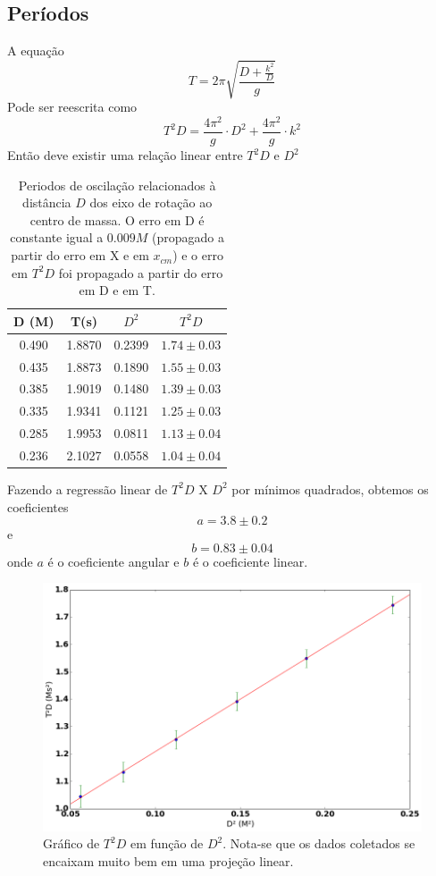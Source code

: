 \documentclass[12pt,a4paper]{article}
\begin{document}
\subsection{Períodos}
A equação $$ T = 2\pi\sqrt{\frac{D + \frac{k^2}{D}}{g}} $$ 
Pode ser reescrita como 
$$ T^2D = \frac{4\pi^2}{g} \cdot D^2 + \frac{4\pi^2}{g} \cdot k^2 $$ 
Então deve existir uma relação linear entre $T^2D$ e $D^2$


  
\begin{table}[!htbp]
\def\arraystretch{1.5}
\begin{tabular}{|c|c|c|c|}
\hline
D (M)& T(s) & $D^2$ & $T^2D$ \\
\hline
0.490 & 1.8870 & 0.2399 & $1.74 \pm 0.03$\\
\hline
0.435 & 1.8873 & 0.1890 & $1.55 \pm 0.03$\\
\hline
0.385 & 1.9019 & 0.1480 & $1.39 \pm 0.03$\\
\hline
0.335 & 1.9341 & 0.1121 & $1.25 \pm 0.03$\\
\hline
0.285 & 1.9953 & 0.0811 & $1.13 \pm 0.04$\\
\hline
0.236 & 2.1027 & 0.0558 & $1.04 \pm 0.04$\\
\hline
\end{tabular} 


\caption{Periodos de oscilação relacionados à distância $D$ dos eixo de rotação ao centro de massa. O erro em D é constante igual a $0.009 M$ (propagado a partir do erro em X e em $x_{cm}$) e o erro em $T^2D$ foi propagado a partir do erro em D e em T.}
\end{table}

Fazendo a regressão linear de $T^2D$ X $D^2$ por mínimos quadrados, obtemos os coeficientes $$ a = 3.8 \pm 0.2 $$ e $$ b = 0.83 \pm 0.04 $$ onde $a$ é o coeficiente angular e $b$ é o coeficiente linear.

\begin{figure}[h]
\caption{Gráfico de $T^2D$ em função de $D^2$. Nota-se que os dados coletados se encaixam muito bem em uma projeção linear.}
\includegraphics[scale=0.55]{index.png} 

\end{figure}
\end{document}
